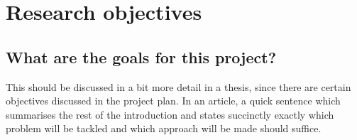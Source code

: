 \section{Research objectives}

\subsection{What are the goals for this project?}
This should be discussed in a bit more detail in a thesis, since there are certain objectives discussed in the project plan.
In an article, a quick sentence which summarises the rest of the introduction and states succinctly exactly which problem will be tackled and which approach will be made should suffice.

